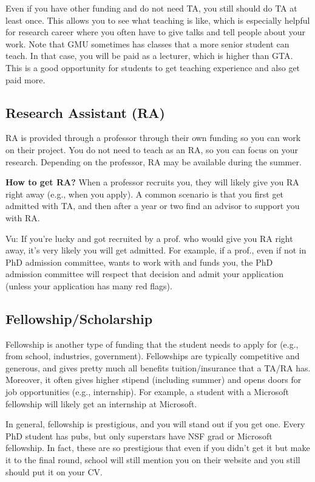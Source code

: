 \documentclass[11pt]{article}
\newenvironment{commentbox}{
 \small
    \begin{cbox}
 }{
   \end{cbox}
}
\begin{document}
Even if you have other funding and do not need TA, you still should do TA at least once.  This allows you to see what teaching is like, which is especially helpful for research career where you often have to give talks and tell people about your work. Note that GMU sometimes has classes that a more senior student can teach.  In that case, you will be paid as a lecturer, which is higher than GTA.  This is a good opportunity for students to get teaching experience and also get paid more.
\subsection{Research Assistant (RA)}
RA is provided through a professor through their own funding so you can work on their project.  
You do not need to teach as an RA, so you can focus on your research. Depending on the professor, RA may be available during the summer.

\textbf{How to get RA?} When a professor recruits you, they will likely give you RA right away (e.g., when you apply).  A common scenario is that you first get admitted with TA, and then after a year or two find an advisor to support you with RA. 


\begin{commentbox}
Vu: If you're lucky and got recruited by a prof. who would give you RA right away, it's very likely you will get admitted.  For example, if a prof., even if not in PhD admission committee, wants to work with and funds you, the PhD admission committee will respect that decision and admit your application (unless your application has many red flags).
\end{commentbox}

\subsection{Fellowship/Scholarship}

Fellowship is another type of funding that the student needs to apply for (e.g., from school, industries, government). Fellowships are typically competitive and generous, and gives pretty much all benefits tuition/insurance that a TA/RA has.  Moreover, it often gives higher stipend (including summer) and opens doors for job opportunities (e.g., internship).  For example, a student with a Microsoft fellowship will likely get an internship at Microsoft.  

In general, fellowship is prestigious, and you will stand out if you get one.  Every PhD student has pubs, but only superstars have NSF grad or Microsoft fellowship. In fact, these are so prestigious that even if you didn't get it but make it to the final round, school will still mention you on their website and you still should put it on your CV.
\end{document}
